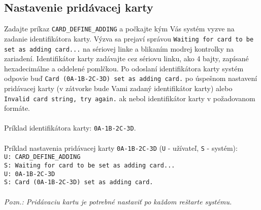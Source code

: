 \documentclass[a4paper]{article}
\begin{document}
\subsection{Nastavenie pridávacej karty}
Zadajte príkaz \texttt{CARD\_DEFINE\_ADDING} a počkajte kým Vás systém vyzve na zadanie identifikátora karty. Výzva sa prejaví správou \texttt{Waiting for card to be set as adding card...} na sériovej linke a blikaním modrej kontrolky na zariadení. Identifikátor karty zadávajte cez sériovu linku, ako 4 bajty, zapísané hexadecimálne a oddelené pomlčkou. Po odoslaní identifikátora karty systém odpovie buď \texttt{Card (0A-1B-2C-3D) set as adding card.} po úspešnom nastavení pridávacej karty (v zátvorke bude Vami zadaný identifikátor karty) alebo \texttt{Invalid card string, try again.} ak nebol identifikátor karty v požadovanom formáte. 
\\\\
Príklad identifikátora karty: \texttt{0A-1B-2C-3D}.
\\\\
Príklad nastavenia pridávacej karty \texttt{0A-1B-2C-3D} (\texttt{U} - užívateľ, \texttt{S} - systém):\\
\texttt{U: CARD\_DEFINE\_ADDING}\\
\texttt{S: Waiting for card to be set as adding card...}\\
\texttt{U: 0A-1B-2C-3D}\\
\texttt{S: Card (0A-1B-2C-3D) set as adding card.}\\
\\
\textit{Pozn.: Pridávaciu kartu je potrebné nastaviť po každom reštarte systému.}
\end{document}
